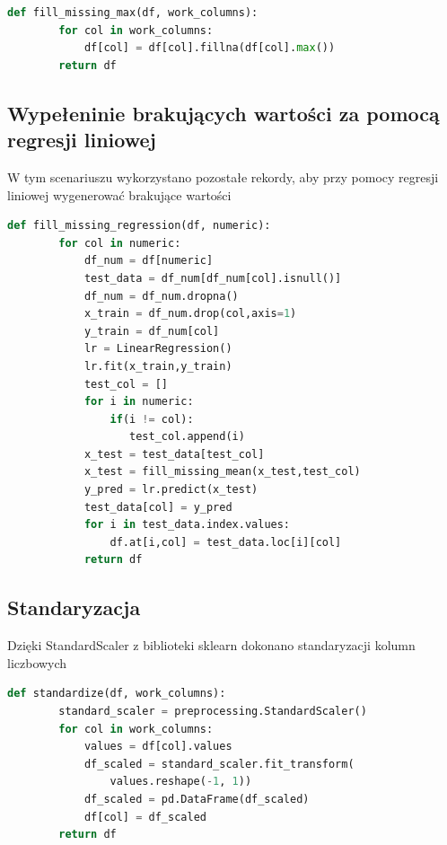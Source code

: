 \documentclass{book}
\begin{document}
\begin{lstlisting}[language=Python, caption={Wypełnienie 
    brakujących wartości maksimum}, captionpos=b]
    def fill_missing_max(df, work_columns):
        for col in work_columns:
            df[col] = df[col].fillna(df[col].max())
        return df
\end{lstlisting}

\subsection{Wypełeninie brakujących wartości za pomocą regresji liniowej}
W tym scenariuszu wykorzystano pozostałe rekordy, 
aby przy pomocy regresji liniowej wygenerować 
brakujące wartości

\begin{lstlisting}[language=Python, caption={Wypełnienie 
    brakujących wartości za pomocą regresji liniowej}, captionpos=b]
    def fill_missing_regression(df, numeric):    
        for col in numeric:
            df_num = df[numeric]
            test_data = df_num[df_num[col].isnull()]
            df_num = df_num.dropna()
            x_train = df_num.drop(col,axis=1)
            y_train = df_num[col]
            lr = LinearRegression()
            lr.fit(x_train,y_train)
            test_col = []
            for i in numeric:
                if(i != col):
                   test_col.append(i)
            x_test = test_data[test_col]
            x_test = fill_missing_mean(x_test,test_col)
            y_pred = lr.predict(x_test)
            test_data[col] = y_pred
            for i in test_data.index.values:
                df.at[i,col] = test_data.loc[i][col]
            return df
\end{lstlisting}

\subsection{Standaryzacja}
Dzięki StandardScaler z biblioteki sklearn dokonano 
standaryzacji kolumn liczbowych

\begin{lstlisting}[language=Python, caption={Standaryzacja 
    kolumn liczbowych}, captionpos=b]
    def standardize(df, work_columns):
        standard_scaler = preprocessing.StandardScaler()
        for col in work_columns:
            values = df[col].values
            df_scaled = standard_scaler.fit_transform(
                values.reshape(-1, 1)) 
            df_scaled = pd.DataFrame(df_scaled)
            df[col] = df_scaled
        return df
\end{lstlisting}
\end{document}
